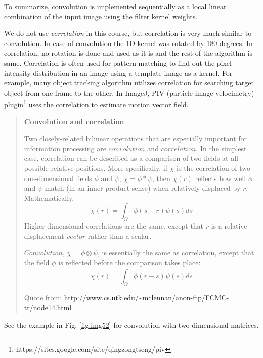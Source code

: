 To summarize, convolution is implemented  sequentially as a local linear combination of the input image using the filter kernel weights. 

We do not use \textit{correlation} in this course, but correlation is very much similar to convolution. In case of convolution the 1D kernel was rotated by 180 degrees. In correlation, no rotation is done and used as it is and the rest of the algorithm is same. Correlation is often used for pattern matching to find out the pixel intensity distribution in an image using a template image as a kernel. For example, many object tracking algorithm utilizes correlation for searching target object from one frame to the other. In ImageJ, PIV (particle image velocimetry) plugin\footnote{https://sites.google.com/site/qingzongtseng/piv} uses the correlation to estimate motion vector field. 


\begin{quote}
{\sffamily\bfseries
Convolution and correlation}

Two closely-related bilinear operations that are especially important
for information processing are $convolution$ and
$correlation$. In the simplest case, correlation can
be described as a comparison of two fields at all possible relative
positions. More specifically, if $\chi$
is the correlation of two one-dimensional fields $\phi$
and $\psi$, $\chi = \phi*\psi$, then $\chi(r)$ reflects how well 
$\phi$ and $\psi$ match (in an inner-product sense) when relatively displaced by
$r$. Mathematically, 
\[
\chi(r)=\int_{\Omega }^{} \phi(s-r)\psi (s)ds
\]
Higher dimensional correlations are the same, except that $r$ is
a relative displacement $vector$ rather than a scalar. 

$Convolution$, $\chi=\phi\otimes \psi$, is essentially the same as correlation, except that the field $\phi$ is reflected before the comparison takes place: 
\[
\chi(r)=\int_{\Omega }^{}  \phi(r-s)\psi  (s)ds
\]

Quote from:
\url{http://www.cs.utk.edu/\~mclennan/anon-ftp/FCMC-tr/node14.html}
\end{quote} 

See the example in Fig. \ref{fig:img52} for convolution with two dimensional matrices. 

